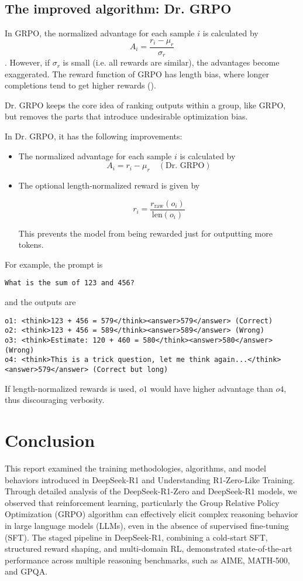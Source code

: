 \documentclass{article} %
\begin{document}
\subsection{The improved algorithm: Dr. GRPO}
In GRPO, the normalized advantage for each sample \(i\) is calculated by
\[A_i = \frac{r_i - \mu_r}{\sigma_r}\]. However, if $\sigma_r$ is small (i.e. all rewards are similar), the advantages become exaggerated. The reward function of GRPO has length bias, where longer completions tend to get higher rewards ()\cite{liu2025understandingr1zeroliketrainingcritical}.

Dr. GRPO keeps the core idea of ranking outputs within a group, like GRPO, but removes the parts that introduce undesirable optimization bias.

In Dr. GRPO, it has the following improvements:
\begin{itemize}
    \item The normalized advantage for each sample \(i\) is calculated by \[ A_i = r_i - \mu_r \quad (\text{Dr. GRPO}) \]
    \item The optional length-normalized reward is given by
    
    \[ r_i = \frac{r_{\text{raw}}(o_i)}{\text{len}(o_i)} \]
    
    This prevents the model from being rewarded just for outputting more tokens.
\end{itemize}
For example, the prompt is
\centerline \texttt{What is the sum of 123 and 456?}
and the outputs are 
\begin{center}
    \texttt{o1: <think>123 + 456 = 579</think><answer>579</answer>  (Correct) \\
o2: <think>123 + 456 = 589</think><answer>589</answer>  (Wrong) \\
o3: <think>Estimate: 120 + 460 = 580</think><answer>580</answer>  (Wrong) \\
o4: <think>This is a trick question, let me think again...</think><answer>579</answer>  (Correct but long)
}
\end{center}

If length-normalized rewards is used, $o1$ would have higher advantage than $o4$, thus discouraging verbosity.

\section{Conclusion}
This report examined the training methodologies, algorithms, and model behaviors introduced in DeepSeek-R1 and Understanding R1-Zero-Like Training. Through detailed analysis of the DeepSeek-R1-Zero and DeepSeek-R1 models, we observed that reinforcement learning, particularly the Group Relative Policy Optimization (GRPO) algorithm can effectively elicit complex reasoning behavior in large language models (LLMs), even in the absence of supervised fine-tuning (SFT). The staged pipeline in DeepSeek-R1, combining a cold-start SFT, structured reward shaping, and multi-domain RL, demonstrated state-of-the-art performance across multiple reasoning benchmarks, such as AIME, MATH-500, and GPQA.
\end{document}
